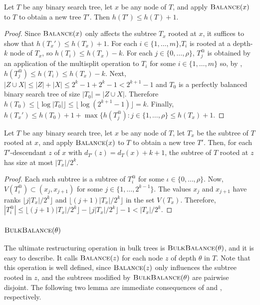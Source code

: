 \documentclass[kpfonts]{patmorin}
\let\le\leqslant
\begin{document}
\begin{lem}
  Let $T$ be any binary search tree, let $x$ be any node of $T$, and apply $\textsc{Balance}(x)$ to $T$ to obtain a new tree $T'$.  Then $h(T')\le h(T)+1$.
\end{lem}

\begin{proof}
  Since $\textsc{Balance}(x)$ only affects the subtree $T_x$ rooted at $x$, it suffices to show that $h(T_x')\le h(T_x)+1$.  For each $i\in\{1,\ldots, m\}$,$T_i$ is rooted at a depth-$k$ node of $T_x$, so $h(T_i)\le h(T_x)-k$. For each $j\in\{0,\ldots,\rho\}$, $T^@_j$ is obtained by an application of the multisplit operation to $T_i$ for some $i\in\{1,\ldots,m\}$ so, by , $h(T^@_j)\le h(T_i)\le h(T_x)-k$.  Next, $|Z\cup X|\le |Z|+|X| \le 2^k-1 + 2^k-1 < 2^{k+1}-1$ and $T_0$ is a perfectly balanced binary search tree of size $|T_0|=|Z\cup X|$.  Therefore $h(T_0)\le \lfloor\log|T_0|\rfloor\le \lfloor\log(2^{k+1}-1)\rfloor = k$.  Finally, $h(T_x')\le h(T_0)+1 +\max\{h(T^@_j):j\in\{1,\ldots,\rho\} \le h(T_x)+1$.  
\end{proof}

\begin{lem}
  Let $T$ be any binary search tree, let $x$ be any node of $T$, let $T_x$ be the subtree of $T$ rooted at $x$, and apply $\textsc{Balance}(x)$ to $T$ to obtain a new tree $T'$.  Then, for each $T'$-descendant $z$ of $x$ with $d_{T'}(z)=d_{T}(x)+k+1$, the subtree of $T$ rooted at $z$ has size at most $|T_x|/2^k$.
\end{lem}

\begin{proof}
  Each such subtree is a subtree of $T^@_i$ for some $\iota\in\{0,\ldots,\rho\}$. Now, $V(T^@_i)\subset (x_j,x_{j+1})$ for some $j\in\{1,\ldots,2^{k-1}\}$.  The values $x_j$ and $x_{j+1}$ have ranks $\lfloor j|T_x|/2^k\rfloor$ and $\lfloor (j+1)|T_x|/2^k\rfloor$ in the set $V(T_x)$.  Therefore, $|T^@_i|\le \lfloor (j+1)|T_x|/2^k\rfloor- \lfloor j|T_x|/2^k\rfloor -1 < |T_x|/2^k$.
\end{proof}

\subsubsection{$\textsc{BulkBalance}(\theta)$}

The ultimate restructuring operation in bulk trees is $\textsc{BulkBalance}(\theta)$, and it is easy to describe.  It calls $\textsc{Balance}(z)$ for each node $z$ of depth $\theta$ in $T$. Note that this operation is well defined, since $\textsc{Balance}(z)$ only influences the subtree rooted in $z$, and the subtrees modified by $\textsc{BulkBalance}(\theta)$ are pairwise disjoint.
The following two lemma are immediate consequences of  and , respectively.
\end{document}
